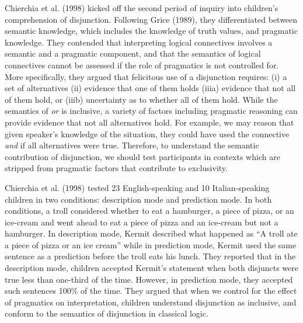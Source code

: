\documentclass[floatsintext,man]{apa6}
\theoremstyle{definition}
\theoremstyle{definition}
\theoremstyle{definition}
\theoremstyle{remark}
\begin{document}
Chierchia et al. (1998) kicked off the second period of inquiry into
children's comprehension of disjunction. Following Grice (1989), they
differentiated between semantic knowledge, which includes the knowledge
of truth values, and pragmatic knowledge. They contended that
interpreting logical connectives involves a semantic and a pragmatic
component, and that the semantics of logical connectives cannot be
assessed if the role of pragmatics is not controlled for. More
specifically, they argued that felicitous use of a disjunction requires:
(i) a set of alternatives (ii) evidence that one of them holds (iiia)
evidence that not all of them hold, or (iiib) uncertainty as to whether
all of them hold. While the semantics of \emph{or} is inclusive, a
variety of factors including pragmatic reasoning can provide evidence
that not all alternatives hold. For example, we may reason that given
speaker's knowledge of the situation, they could have used the
connective \emph{and} if all alternatives were true. Therefore, to
understand the semantic contribution of disjunction, we should test
participants in contexts which are stripped from pragmatic factors that
contribute to exclusivity.

Chierchia et al. (1998) tested 23 English-speaking and 10
Italian-speaking children in two conditions: description mode and
prediction mode. In both conditions, a troll considered whether to eat a
hamburger, a piece of pizza, or an ice-cream and went ahead to eat a
piece of pizza and an ice-cream but not a hamburger. In description
mode, Kermit described what happened as \enquote{A troll ate a piece of
pizza or an ice cream} while in prediction mode, Kermit used the same
sentence as a prediction before the troll eats his lunch. They reported
that in the description mode, children accepted Kermit's statement when
both disjuncts were true less than one-third of the time. However, in
prediction mode, they accepted such sentences 100\% of the time. They
argued that when we control for the effect of pragmatics on
interpretation, children understand disjunction as inclusive, and
conform to the semantics of disjunction in classical logic.
\end{document}
